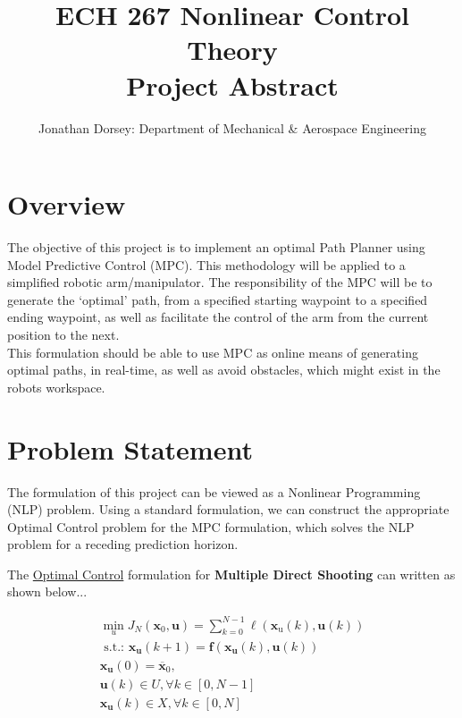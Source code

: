\documentclass[12px]{article}
\begin{document}
    \title{ECH 267 Nonlinear Control Theory \\ Project Abstract }

    \author{Jonathan Dorsey: Department of Mechanical \& Aerospace Engineering}

    \maketitle


    \section*{Overview}

    The objective of this project is to implement an optimal Path Planner using Model Predictive Control (MPC). This methodology will be applied to a  simplified robotic arm/manipulator. The responsibility of the MPC will be to generate the `optimal' path, from a specified starting waypoint to a specified ending waypoint, as well as facilitate the control of the arm from the current position to the next. \\


    This formulation should be able to use MPC as online means of generating optimal paths, in real-time, as well as avoid obstacles, which might exist in the robots workspace.











    \section*{Problem Statement}

    The formulation of this project can be viewed as a Nonlinear Programming (NLP) problem. Using a standard formulation, we can construct the appropriate Optimal Control problem for the MPC formulation, which solves the NLP problem for a receding prediction horizon.

    The \underline{Optimal Control} formulation for \textbf{Multiple Direct Shooting} can written as shown below...

    $$
    \begin{array}{l}
    \min _{u} J_{N}\left(\mathbf{x}_{0}, \mathbf{u}\right)=\sum_{k=0}^{N-1} \ell\left(\mathbf{x}_{\mathrm{u}}(k), \mathbf{u}(k)\right) \\
    \text { s.t.: } \mathbf{x}_{\mathbf{u}}(k+1)=\mathbf{f}\left(\mathbf{x}_{\mathbf{u}}(k), \mathbf{u}(k)\right) \\
    \mathbf{x}_{\mathbf{u}}(0)=\overline{\mathbf{x}}_{0}, \\
    \mathbf{u}(k) \in U, \forall k \in[0, N-1] \\
    \mathbf{x}_{\mathbf{u}}(k) \in X, \forall k \in[0, N]
    \end{array}
    $$
\end{document}
